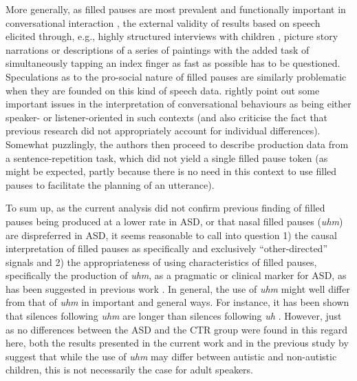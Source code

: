 More generally, as filled pauses are most prevalent and functionally important in conversational interaction \citep{corleyHesitationSpeechCan2003, foxtreeListenersUsesUm2001}, the external validity of results based on speech elicited through, e.g., highly structured interviews with children \citep{gormanUhUmChildren2016}, picture story narrations \citep{suhNarrativePerformanceOptimal2014} or descriptions of a series of paintings with the added task of simultaneously tapping an index finger as fast as possible \citep{irvineUhUmAutism2016} has to be questioned. Speculations as to the pro-social nature of filled pauses are similarly problematic when they are founded on this kind of speech data. \citet{engelhardtSpeakerVersusListenerOrientedDisfluency2017} rightly point out some important issues in the interpretation of conversational behaviours as being either speaker- or listener-oriented in such contexts (and also criticise the fact that previous research did not appropriately account for individual differences). Somewhat puzzlingly, the authors then proceed to describe production data from a sentence-repetition task, which did not yield a single filled pause token (as might be expected, partly because there is no need in this context to use filled pauses to facilitate the planning of an utterance).

To sum up, as the current analysis did not confirm previous finding of filled pauses being produced at a lower rate in ASD, or that nasal filled pauses (\emph{uhm}) are dispreferred in ASD, it seems reasonable to call into question 1) the causal interpretation of filled pauses as specifically and exclusively ``other-directed” signals \citep[e.g.][]{lakeListenerVsSpeakeroriented2011} and 2) the appropriateness of using characteristics of filled pauses, specifically the production of \emph{uhm}, as a pragmatic or clinical marker for ASD, as has been suggested in previous work \citep{irvineUhUmAutism2016,mcgregorBriefReportUm2020}. In general, the use of \emph{uhm} might well differ from that of \emph{uhm} in important and general ways. For instance, it has been shown that silences following \emph{uhm} are longer than silences following \emph{uh} \citep[; ][]{clarkUsingUhUm2002}. However, just as no differences between the ASD and the CTR group were found in this regard here, both the results presented in the current work and in the previous study by \citet{lakeListenerVsSpeakeroriented2011} suggest that while the use of \emph{uhm} may differ between autistic and non-autistic children, this is not necessarily the case for adult speakers.


